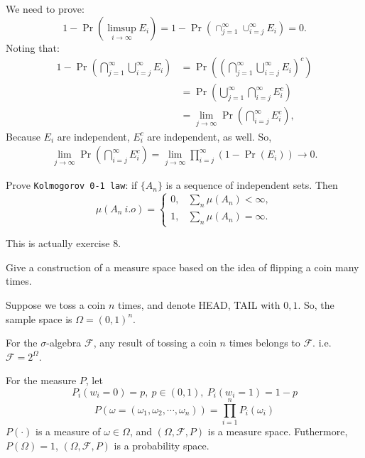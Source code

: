 \documentclass[12pt]{article}
\newenvironment{exercise}[1]{\begin{tcolorbox}[colback=black!15, colframe=black!80, breakable, title=#1]}{\end{tcolorbox}}
\newenvironment{solution}{\begin{tcolorbox}[colback=white, colframe=black!50, breakable, title=Solution. ]\setlength{\parskip}{0.8em}}{\end{tcolorbox}}
\begin{document}
\begin{solution}
        We need to prove: 
        \[
            1 - \Pr (\limsup_{i \to \infty} E_i)=1-\Pr(\cap_{j=1}^\infty\cup_{i=j}^\infty E_i) = 0. 
        \]
        Noting that: 
        \[
            \begin{aligned}
                1-\Pr\left(\bigcap_{j=1}^\infty\bigcup_{i=j}^\infty E_i\right)
                &=\Pr \left(\left(\bigcap _{j=1}^{\infty }\bigcup _{i=j}^{\infty }E_{i}\right)^{c}\right)\\
                &=\Pr \left(\bigcup _{j=1}^{\infty }\bigcap _{i=j}^{\infty }E_{i}^{c}\right)\\
                &=\lim _{j\to \infty }\Pr \left(\bigcap _{i=j}^{\infty }E_{i}^{c}\right), 
            \end{aligned}
        \]
        Because $E_i$ are independent, $E_i^c$ are independent, as well. So, 
        \[
            \begin{aligned}
                \lim _{j\to \infty }\Pr \left(\bigcap _{i=j}^{\infty }E_{i}^{c}\right)=\lim_{j\to \infty }\prod_{i=j}^{\infty }(1-\Pr(E_i))\to 0. 
            \end{aligned}
        \]
    \end{solution}

    \begin{exercise}{9}
        Prove \texttt{Kolmogorov 0-1 law}: if $\{A_n\}$ is a sequence of independent sets. Then
        \[
            \mu(A_n\ i.o)=\begin{cases}
                0, & \sum_{n}\mu(A_n)<\infty, \\
                1, & \sum_{n}\mu(A_n)=\infty. 
            \end{cases}
        \]
    \end{exercise}
    \begin{solution}
        This is actually exercise 8. 
    \end{solution}

    \begin{exercise}{10}
        Give a construction of a measure space based on the idea of flipping a coin many times. 
    \end{exercise}

    \begin{solution}
        Suppose we toss a coin $n$ times, and denote HEAD, TAIL with $0,1$. So, the sample space is $\Omega=(0,1)^n$. 

        For the $\sigma$-algebra $\mathscr{F}$, any result of tossing a coin $n$ times belongs to $\mathscr{F}$. i.e. $\mathscr{F}=2^\Omega$. 

        For the measure $P$, let 
        \[P_i(w_i=0)=p,\ p\in(0,1),\ P_i(w_i=1)=1-p\]
        \[P(\omega=(\omega_1,\omega_2,\cdots,\omega_n))=\prod_{i=1}^nP_i(\omega_i)\]
        $P(\cdot)$ is a measure of $\omega\in\Omega$, and $(\Omega, \mathscr{F}, P)$ is a measure space. Futhermore, $P(\Omega)=1$, $(\Omega, \mathscr{F}, P)$ is a probability space. 
    \end{solution}

\end{document}
